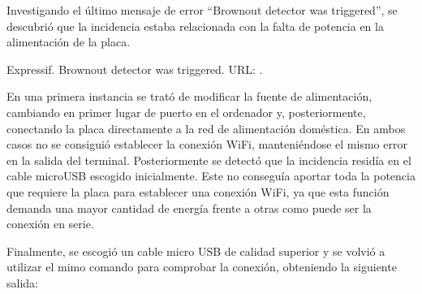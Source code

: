\documentclass[a4paper,11pt,spanish]{sphinxmanual}
\begin{document}
\sphinxAtStartPar
Investigando el último mensaje de error “Brownout detector was triggered”,
se descubrió que la incidencia estaba relacionada con la falta de potencia en
la alimentación de la placa. %
\begin{footnote}[1]\sphinxAtStartFootnote
Expressif. Brownout detector was triggered. URL: .
%
\end{footnote}

\sphinxAtStartPar
En una primera instancia se trató de modificar la fuente de alimentación,
cambiando en primer lugar de puerto en el ordenador y, posteriormente,
conectando la placa directamente a la red de alimentación doméstica. En
ambos casos no se consiguió establecer la conexión Wi\sphinxhyphen{}Fi, manteniéndose el
mismo error en la salida del terminal. Posteriormente se detectó que la
incidencia residía en el cable micro\sphinxhyphen{}USB escogido inicialmente. Este no
conseguía aportar toda la potencia que requiere la placa para establecer
una conexión Wi\sphinxhyphen{}Fi, ya que esta función demanda una mayor cantidad de energía
frente a otras como puede ser la conexión en serie.

\sphinxAtStartPar
Finalmente, se escogió un cable micro USB de calidad superior y se
volvió a utilizar el mimo comando para comprobar la conexión, obteniendo
la siguiente salida:
\end{document}
